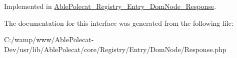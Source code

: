 Implemented in \hyperlink{class_able_polecat___registry___entry___dom_node___response_a094778dd1c04fe44626000b47ea0c0bb}{Able\+Polecat\+\_\+\+Registry\+\_\+\+Entry\+\_\+\+Dom\+Node\+\_\+\+Response}.



The documentation for this interface was generated from the following file\+:\begin{DoxyCompactItemize}
\item 
C\+:/wamp/www/\+Able\+Polecat-\/\+Dev/usr/lib/\+Able\+Polecat/core/\+Registry/\+Entry/\+Dom\+Node/Response.\+php\end{DoxyCompactItemize}
